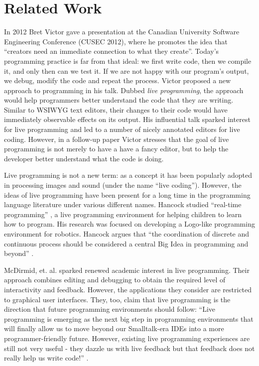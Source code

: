 \section{Related Work}
\label{sec:live}

In 2012 Bret Victor gave a presentation \cite{bretVictorVideo} at the Canadian University Software Engineering Conference (CUSEC 2012), where he promotes the idea that ``creators need an immediate connection to what they create''. Today's programming practice is far from that ideal: we first write code, then we compile it, and only then can we test it. If we are not happy with our program's output, we debug, modify the code and repeat the process. Victor proposed a new approach to programming in his talk. Dubbed  {\emph {live programming}}, the approach would help programmers better understand the code that they are writing. Similar to WSIWYG text editors, their changes to their code would have immediately observable effects on its output. His influential talk sparked interest for live programming and led to a number of nicely annotated editors for live coding. However, in a follow-up paper \cite{victor2012} Victor stresses that the goal of live programming is not merely to have a have a fancy editor, but to help the developer better understand what the code is doing.

Live programming is not a new term: as a concept it has been popularly adopted in processing images and sound (under the name ``live coding'')\cite{mclean14}. However, the ideas of live programming have been present for a long time in the programming language literature under various different names. Hancock studied ``real-time programming'' \cite{HancockPhDThesis}, a live programming environment for helping children to learn how to program. His research was focused on developing a Logo-like programming environment for robotics. Hancock argues that ``the coordination of discrete and continuous process should be considered a central Big Idea in programming and beyond'' \cite{HancockPhDThesis}.

McDirmid, et. al. \cite{McDirmid13oopsla, BurckhardtFHMMTK13_PLDI, McDirmidE14} sparked renewed academic interest in live programming. Their approach combines editing and debugging to obtain the required level of interactivity and  feedback. However, the applications they consider are restricted to graphical user interfaces. They, too, claim that live programming is the direction that  future programming environments should follow: ``Live programming is emerging as the next big step in programming environments that will finally allow us to move beyond our Smalltalk-era IDEs into a more programmer-friendly future. However, existing live programming experiences are still not very useful - they dazzle us with live feedback but that feedback does not really help us write code!'' \cite{McDirmid13oopsla}.

